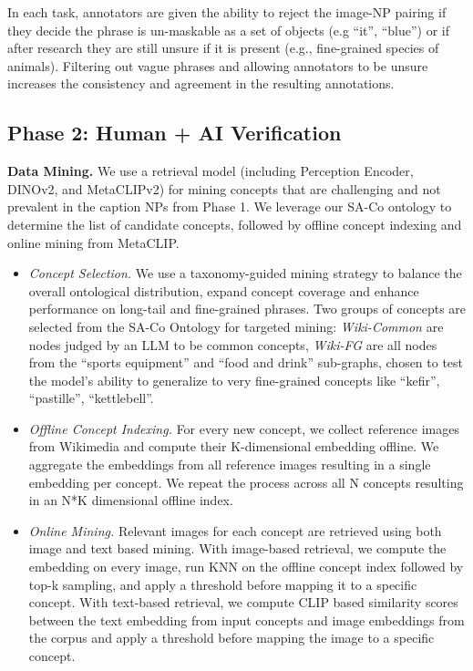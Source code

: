 \documentclass[]{fairmeta}
\newcommand{\eg}{e.g., }
\newcommand{\dsname}{{SA-Co}\xspace}
\renewcommand{\paragraph}[1]{%
	\noindent\textbf{#1.}\noindent\xspace%
}
\begin{document}
In each task, annotators are given the ability to reject the image-NP pairing if they decide the phrase is un-maskable as a set of objects (e.g ``it'', ``blue'') or if after research they are still unsure if it is present (\eg fine-grained species of animals). Filtering out vague phrases and allowing annotators to be unsure increases the consistency and agreement in the resulting annotations.

\subsection{Phase 2: Human + AI Verification}
\label{sec:data_engine_phase_2}


\paragraph{Data Mining} We use a retrieval model (including Perception Encoder, DINOv2, and MetaCLIPv2) for mining concepts
that are challenging and 
not prevalent in the caption NPs from Phase 1. We leverage our \dsname ontology to determine the list of candidate concepts, followed by offline concept indexing and online mining from MetaCLIP. 

\begin{itemize}
	\item \textit{Concept Selection.} We use a taxonomy-guided mining strategy to balance the overall ontological distribution, expand concept coverage and enhance performance on long-tail and fine-grained phrases. Two groups of concepts are selected from the \dsname Ontology for targeted mining: \textit{Wiki-Common} are nodes judged by an LLM to be common concepts, \textit{Wiki-FG} are all nodes from the ``sports equipment'' and ``food and drink'' sub-graphs, chosen to test the model's ability to generalize to very fine-grained concepts like ``kefir'', ``pastille'', ``kettlebell''. 
	
	\item \textit{Offline Concept Indexing.} For every new concept, we collect reference images from Wikimedia and compute their K-dimensional embedding offline. We aggregate the embeddings from all reference images resulting in a single embedding per concept. We repeat the process across all N concepts resulting in an N*K dimensional offline index.
	
	\item \textit{Online Mining.} Relevant images for each concept are retrieved using both image and text based mining. With image-based retrieval, we compute the embedding on every image, run KNN on the offline concept index followed by top-k sampling, and apply a threshold before mapping it to a specific concept. With text-based retrieval, we compute CLIP based similarity scores between the text embedding from input concepts and image embeddings from the corpus and apply a threshold before mapping the image to a specific concept.
\end{itemize}
\end{document}
